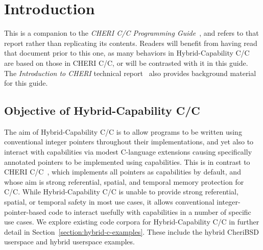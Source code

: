 \documentclass[12pt,twoside,openright,a4paper]{article}
\newcommand{\note}[2]{{\color{blue}[ Note: #1 - #2]}}
\renewcommand{\note}[2]{\relax\ifhmode\unskip\fi}
\newcommand{\rwnote}[1]{\note{#1}{Robert W.}}
\newcommand{\psnote}[1]{\note{#1}{Peter S.}}
\newcommand*{\cpp}{\texorpdfstring{C\textsmaller[2]{\protect\nolinebreak[4]\hspace{-.05em}\raisebox{.45ex}{\textbf{++}}}}{C++}}
\newcommand*{\COrCpp}{C/\cpp{}}
\newcommand*{\purecapCOrCpp}{CHERI \COrCpp{}}
\newcommand*{\hybridCOrCpp}{Hybrid-Capability \COrCpp{}}
\begin{document}
\newcommand{\reviewwarning}{
\textbf{
As \hybridCOrCpp{} remains an area of active research and development, this
report is a request for review and comments rather than a specification.
}
\rwnote{This last sentence will go away in a final version.}
}

\begin{abstract}
\abstracttext

\reviewwarning
\end{abstract}

\newpage
\setcounter{tocdepth}{2}
\tableofcontents

\newpage

\section{Introduction}

%
%
\abstracttext

This is a companion to the \textit{\purecapCOrCpp{} Programming
Guide}~\cite{UCAM-CL-TR-947}, and refers to that report rather than
replicating its contents.
Readers will benefit from having read that document prior to this one, as
many behaviors in \hybridCOrCpp{} are based on those in \purecapCOrCpp{}, or
will be contrasted with it in this guide.
The \textit{Introduction to CHERI} technical
report~\cite{UCAM-CL-TR-941} also provides background material for this
guide.

\subsection{Objective of \hybridCOrCpp{}}

The aim of \hybridCOrCpp{} is to allow programs to be written using
conventional integer pointers throughout their implementations, and yet also
to interact with capabilities via modest C-language extensions causing
specifically annotated pointers to be implemented using capabilities.
This is in contrast to \purecapCOrCpp{}~\cite{UCAM-CL-TR-947}, which
implements all pointers as capabilities by default, and whose aim is strong
referential, spatial, and temporal memory protection for C/\cpp{}.
\psnote{including ``temporal'' there, unqualified, is going to be confusing.  Suggest splitting the sentence up and describing more explicitly what the current state and plausible options are w.r.t. temporal}
While \hybridCOrCpp{} is unable to provide strong referential, spatial, or
temporal safety in most use cases, it allows conventional
integer-pointer-based code to interact usefully with capabilities in a number
of specific use cases.
\psnote{that seems to underplay what one can get from hybrid -- surely one can say something about ``specific protections'' or ``protection in specific ways'' or something?}
We explore existing code corpora for \hybridCOrCpp{} in further detail in
Section~\ref{section:hybrid-c-examples}.
These include the hybrid CheriBSD userspace and hybrid userspace examples.
\end{document}

